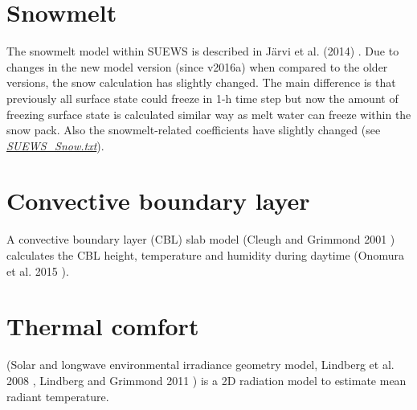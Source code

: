 \documentclass[letterpaper,10pt,english]{sphinxmanual}
\begin{document}
\section{Snowmelt}
\label{\detokenize{parameterisations-and-sub-models:snowmelt}}
The snowmelt model within SUEWS is described in Järvi et al.
(2014) \label{\detokenize{parameterisations-and-sub-models:id19}}{\hyperref[\detokenize{references:leena2014}]{\sphinxcrossref{{[}Leena2014{]}}}}. Due to changes in the new model version (since v2016a)
when compared to the older versions, the snow calculation has slightly
changed. The main difference is that previously all surface state could
freeze in 1-h time step but now the amount of freezing surface state is
calculated similar way as melt water can freeze within the snow pack.
Also the snowmelt-related coefficients have slightly changed (see
{\hyperref[\detokenize{parameterisations-and-sub-models:SUEWS_Snow.txt}]{\emph{SUEWS\_Snow.txt}}}).


\section{Convective boundary layer}
\label{\detokenize{parameterisations-and-sub-models:convective-boundary-layer}}
A convective boundary layer (CBL) slab model (Cleugh and Grimmond
2001 \label{\detokenize{parameterisations-and-sub-models:id20}}{\hyperref[\detokenize{references:cg2001}]{\sphinxcrossref{{[}CG2001{]}}}}) calculates the CBL height, temperature and humidity during
daytime (Onomura et al. 2015 \label{\detokenize{parameterisations-and-sub-models:id21}}{\hyperref[\detokenize{references:shiho2015}]{\sphinxcrossref{{[}Shiho2015{]}}}}).


\section{Thermal comfort}
\label{\detokenize{parameterisations-and-sub-models:thermal-comfort}}
 (Solar and longwave environmental irradiance geometry model,
Lindberg et al. 2008 \label{\detokenize{parameterisations-and-sub-models:id22}}{\hyperref[\detokenize{references:fl2008}]{\sphinxcrossref{{[}FL2008{]}}}}, Lindberg and Grimmond 2011 \label{\detokenize{parameterisations-and-sub-models:id23}}{\hyperref[\detokenize{references:fl2011}]{\sphinxcrossref{{[}FL2011{]}}}}) is a 2D
radiation model to estimate mean radiant temperature.

\begin{figure}[htbp]
\centering

\noindent{}
\end{figure}
\end{document}
